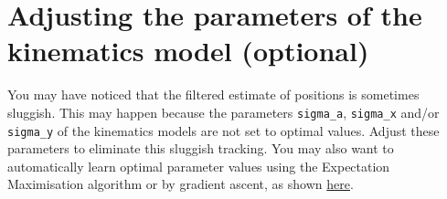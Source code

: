 \documentclass[12pt]{article}
\begin{document}
\section{Adjusting the parameters of the kinematics model (optional)}

You may have noticed that the filtered estimate of positions is sometimes
sluggish. This may happen because the parameters \texttt{sigma\_a},
\texttt{sigma\_x} and/or \texttt{sigma\_y} of the kinematics models are not set
to optimal values. Adjust these parameters to eliminate this sluggish tracking.
You may also want to automatically learn optimal parameter values using the
Expectation Maximisation algorithm or by gradient ascent, as shown
\href{https://joacorapela.github.io/lds_python/auto_examples/tracking/plotEMvsGAcomparisonForagingMouse.html#sphx-glr-auto-examples-tracking-plotemvsgacomparisonforagingmouse-py}{here}.



\end{document}
